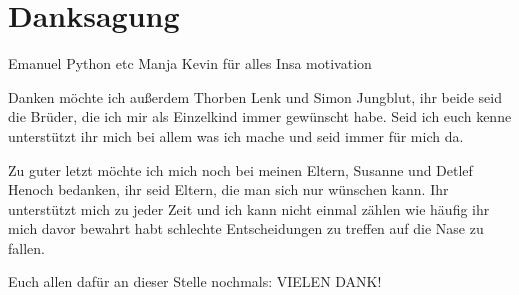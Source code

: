 \chapter*{Danksagung}

\blindtext

Emanuel Python etc
Manja Kevin für alles
Insa motivation

Danken möchte ich außerdem Thorben Lenk und Simon Jungblut, ihr beide seid die Brüder, die ich mir als Einzelkind immer gewünscht habe. Seid ich euch kenne unterstützt ihr mich bei allem was ich mache und seid immer für mich da. 

\vspace{1em}

Zu guter letzt möchte ich mich noch bei meinen Eltern, Susanne und Detlef Henoch bedanken, ihr seid Eltern, die man sich nur wünschen kann. Ihr unterstützt mich zu jeder Zeit und ich kann nicht einmal zählen wie häufig ihr mich davor bewahrt habt schlechte Entscheidungen zu treffen auf die Nase zu fallen. 

\vspace{1em}

Euch allen dafür an dieser Stelle nochmals: VIELEN DANK!
